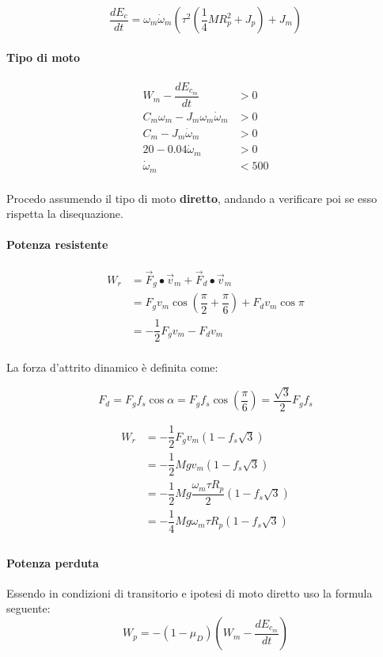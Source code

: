 \documentclass[main.tex]{subfiles}
\begin{document}
\[
\dfrac{dE_c}{dt} =  \omega_m\dot{\omega}_m(\tau^2(\dfrac{1}{4}M R_p^2 + J_p) +  J_m)
\]

\paragraph{Tipo di moto}

\begin{align*}
	W_m - \dfrac{dE_{c_m}}{dt} &> 0\\
	C_m\omega_m -J_m\omega_m\dot{\omega}_m &> 0\\
	C_m -J_m\dot{\omega}_m &> 0\\
	20 -0.04\dot{\omega}_m &> 0\\
	\dot{\omega}_m &< 500\\
\end{align*}

Procedo assumendo il tipo di moto \textbf{diretto}, andando a verificare poi se esso rispetta la disequazione.

\paragraph{Potenza resistente}

\begin{align*}
	W_r &= \vec{F}_g\bullet\vec{v}_m + \vec{F}_d\bullet\vec{v}_m \\
	       &= F_gv_m\cos\left ( \dfrac{\pi}{2} + \dfrac{\pi}{6} \right ) + F_dv_m\cos\pi \\
	       &= -\dfrac{1}{2}F_gv_m - F_dv_m \\
\end{align*}

La forza d'attrito dinamico è definita come:

\[
	F_d = F_gf_s\cos\alpha = F_gf_s\cos\left ( \dfrac{\pi}{6} \right ) = \dfrac{\sqrt{3}}{2}F_gf_s
\]

\begin{align*}
	W_r &= -\dfrac{1}{2}F_gv_m(1-f_s\sqrt{3}) \\
		   &= -\dfrac{1}{2}Mgv_m(1-f_s\sqrt{3}) \\
		   &= -\dfrac{1}{2}Mg\dfrac{\omega_m \tau R_p}{2}(1-f_s\sqrt{3}) \\
		   &= -\dfrac{1}{4}Mg\omega_m \tau R_p(1-f_s\sqrt{3}) \\
\end{align*}

\paragraph{Potenza perduta} Essendo in condizioni di transitorio e ipotesi di moto diretto uso la formula seguente:
\[
	W_p =  -(1-\mu_D)(W_m - \dfrac{dE_{c_m}}{dt})
\]
\end{document}

